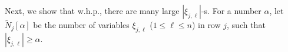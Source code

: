 \documentclass[times,sort&compress,3p]{elsarticle}
\begin{document}
Next, we show that w.h.p., there are many large $|\xi_{j,\ell}|$-s. 
For a number $\alpha$, let $\tilde{N}_j[\alpha]$ be the number of variables $\xi_{j,\ell}$ ($1\le \ell \le n$) in row $j$, such that $|\xi_{j,\ell}|\ge \alpha$.
\end{document}

